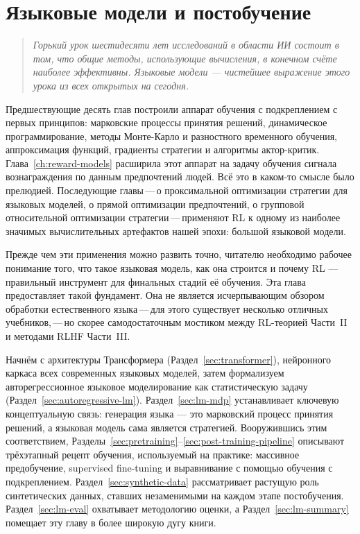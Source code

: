 \chapter[Языковые модели и постобучение]{Языковые модели и постобучение}
\label{ch:lm-post-training}

\begin{quote}
\itshape
Горький урок шестидесяти лет исследований в области ИИ состоит в том, что общие методы, использующие вычисления, в конечном счёте наиболее эффективны. Языковые модели --- чистейшее выражение этого урока из всех открытых на сегодня.
\end{quote}

\bigskip

Предшествующие десять глав построили аппарат обучения с подкреплением с первых принципов: марковские процессы принятия решений, динамическое программирование, методы Монте-Карло и разностного временного обучения, аппроксимация функций, градиенты стратегии и алгоритмы актор-критик. Глава~\ref{ch:reward-models} расширила этот аппарат на задачу обучения сигнала вознаграждения по данным предпочтений людей. Всё это в каком-то смысле было прелюдией. Последующие главы\,---\,о проксимальной оптимизации стратегии для языковых моделей, о прямой оптимизации предпочтений, о групповой относительной оптимизации стратегии\,---\,применяют RL к одному из наиболее значимых вычислительных артефактов нашей эпохи: большой языковой модели.

Прежде чем эти применения можно развить точно, читателю необходимо рабочее понимание того, что такое языковая модель, как она строится и почему RL --- правильный инструмент для финальных стадий её обучения. Эта глава предоставляет такой фундамент. Она не является исчерпывающим обзором обработки естественного языка\,---\,для этого существует несколько отличных учебников,\,---\,но скорее самодостаточным мостиком между RL-теорией Части~II и методами RLHF Части~III.

Начнём с архитектуры Трансформера (Раздел~\ref{sec:transformer}), нейронного каркаса всех современных языковых моделей, затем формализуем авторегрессионное языковое моделирование как статистическую задачу (Раздел~\ref{sec:autoregressive-lm}). Раздел~\ref{sec:lm-mdp} устанавливает ключевую концептуальную связь: генерация языка --- это марковский процесс принятия решений, а языковая модель сама является стратегией. Вооружившись этим соответствием, Разделы~\ref{sec:pretraining}--\ref{sec:post-training-pipeline} описывают трёхэтапный рецепт обучения, используемый на практике: массивное предобучение, supervised fine-tuning и выравнивание с помощью обучения с подкреплением. Раздел~\ref{sec:synthetic-data} рассматривает растущую роль синтетических данных, ставших незаменимыми на каждом этапе постобучения. Раздел~\ref{sec:lm-eval} охватывает методологию оценки, а Раздел~\ref{sec:lm-summary} помещает эту главу в более широкую дугу книги.

